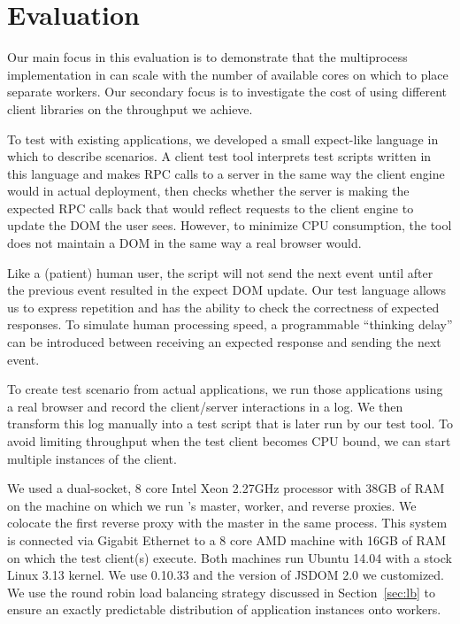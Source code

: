 \chapter{Evaluation}

Our main focus in this evaluation is to demonstrate that the multiprocess implementation
in \cbtwo can scale with the number of available cores on which to place separate workers.
Our secondary focus is to investigate the cost of using different client libraries on 
the throughput we achieve.

To test \cbtwo with existing applications, we developed a small expect-like language 
in which to describe scenarios. A client test tool interprets test scripts written in
this language and makes RPC calls to a server in the same way the client engine would
in actual deployment, then checks whether the server is making the expected RPC
calls back that would reflect requests to the client engine to update the DOM the
user sees.  
However, to minimize CPU consumption, the tool does not maintain a DOM in the same
way a real browser would.

Like a (patient) human user, the script will not send the next event until after the
previous event resulted in the expect DOM update.  
Our test language allows us to express repetition and has the ability to check
the correctness of expected responses.  
To simulate human processing speed, a programmable ``thinking delay'' can be introduced 
between receiving an expected response and sending the next event.

To create test scenario from actual applications,
we run those applications using a real browser and record the client/server interactions
in a log.  We then transform this log manually into a test script that is later run 
by our test tool.  To avoid limiting throughput when the test client becomes CPU bound,
we can start multiple instances of the client.

We used a dual-socket, 8 core Intel Xeon 2.27GHz processor with 38GB of RAM on
the machine on which we run \cbtwo{}'s master, worker, and reverse proxies.
We colocate the first reverse proxy with the master in the same process. This
system is connected via Gigabit Ethernet to a 8 core AMD machine with 16GB of
RAM on which the test client(s) execute. Both machines run  Ubuntu 14.04 with
a stock Linux 3.13 kernel.  We use \nodejs{} 0.10.33 and the version of JSDOM
2.0 we customized.  We use the round robin load balancing strategy discussed in
Section~\ref{sec:lb} to ensure an exactly predictable distribution
of application instances onto workers.

